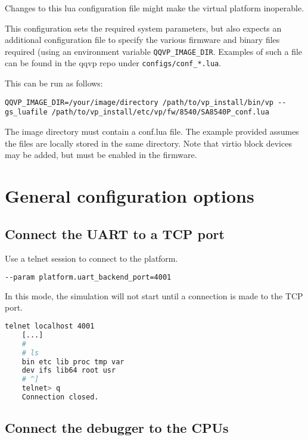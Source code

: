 \caution Changes to this lua configuration file might make the virtual platform inoperable.

This configuration sets the required system parameters,
but also expects an additional configuration file to specify the
various firmware and binary files required (using an environment variable
{\small{\lstinline!QQVP_IMAGE_DIR!}}.  Examples of such a file can be found
in the qqvp repo under {\small{\lstinline!configs/conf_*.lua!}}.

This can be run as follows:

{\small{\lstinline!QQVP_IMAGE_DIR=/your/image/directory /path/to/vp_install/bin/vp --gs_luafile /path/to/vp_install/etc/vp/fw/8540/SA8540P_conf.lua!}}

The image directory must contain a conf.lua file. The example provided assumes
the files are locally stored in the same directory. Note that
virtio block devices may be added, but must be enabled in the firmware.

\clearpage
\section{General configuration options}

\subsection{Connect the UART to a TCP port}

Use a telnet session to connect to the platform. \leavevmode

\small
\begin{lstlisting}[language=bash]
    --param platform.uart_backend_port=4001
\end{lstlisting}
\normalsize

In this mode, the simulation will not start until a connection is made to the TCP port.

\small
\begin{lstlisting}[language=bash]
    telnet localhost 4001
    [...]
    #
    # ls
    bin etc lib proc tmp var
    dev ifs lib64 root usr
    # ^]
    telnet> q
    Connection closed.
\end{lstlisting}
\normalsize


\subsection{Connect the debugger to the CPUs}
\label{sec:connect-debugger-cpus}

